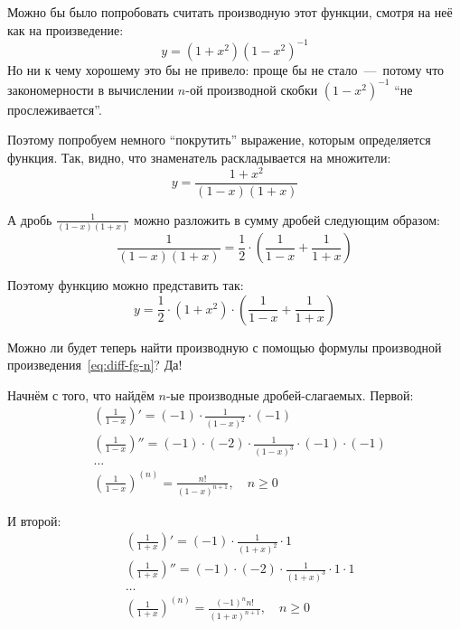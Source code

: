 \documentclass[a4paper,12pt]{article}
\begin{document}
  \begin{solution}
    Можно бы было попробовать считать производную этот функции, смотря на неё как на произведение:
    \[
      y = \left(1 + x^2\right) \left(1 - x^2\right)^{-1}
    \]
    Но ни к чему хорошему это бы не привело: проще бы не стало~---~потому что закономерности в вычислении $n$-ой производной скобки $\left(1 - x^2\right)^{-1}$ ``не прослеживается''.

    Поэтому попробуем немного ``покрутить'' выражение, которым определяется функция.
    Так, видно, что знаменатель раскладывается на множители:
    \[
      y = \frac{1 + x^2}{(1 - x)(1 + x)}
    \]

    А дробь $\frac{1}{(1 - x)(1 + x)}$ можно разложить в сумму дробей следующим образом:
    \[
      \frac{1}{(1 - x)(1 + x)} = \frac{1}{2} \cdot \left(\frac{1}{1 - x} + \frac{1}{1 + x}\right)
    \]

    Поэтому функцию можно представить так:
    \[
      y = \frac{1}{2} \cdot \left(1 + x^2\right) \cdot \left(\frac{1}{1 - x} + \frac{1}{1 + x}\right)
    \]

    Можно ли будет теперь найти производную с помощью формулы производной произведения~\eqref{eq:diff-fg-n}?
    Да!

    Начнём с того, что найдём $n$-ые производные дробей-слагаемых.
    Первой:
    \[
      \begin{aligned}
        &\left(\frac{1}{1 - x}\right)' = (-1) \cdot \frac{1}{(1 - x)^2} \cdot (-1)\\
        &\left(\frac{1}{1 - x}\right)'' = (-1) \cdot (-2) \cdot \frac{1}{(1 - x)^3} \cdot (-1) \cdot (-1)\\
        &\ldots\\
        &\left(\frac{1}{1 - x}\right)^{(n)} = \frac{n!}{(1 - x)^{n + 1}},\quad n \geq 0
      \end{aligned}
    \]

    И второй:
    \[
      \begin{aligned}
        &\left(\frac{1}{1 + x}\right)' = (-1) \cdot \frac{1}{(1 + x)^2} \cdot 1\\
        &\left(\frac{1}{1 + x}\right)'' = (-1) \cdot (-2) \cdot \frac{1}{(1 + x)^3} \cdot 1 \cdot 1\\
        &\ldots\\
        &\left(\frac{1}{1 + x}\right)^{(n)} = \frac{(-1)^n n!}{(1 + x)^{n + 1}},\quad n \geq 0
      \end{aligned}
    \]


\end{solution}
\end{document}
